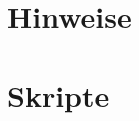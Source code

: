 \begin{appendix}
    \chapter{Hinweise}\label{ch:hinweise}
    

    \chapter{Skripte}\label{ch:skripte}
    
    
    
    
    
\end{appendix}

